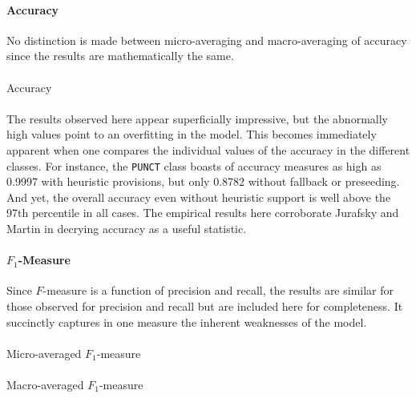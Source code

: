 \documentclass[11pt,a4paper]{article}
\begin{document}
\paragraph{Accuracy}
No distinction is made between micro-averaging and macro-averaging
of accuracy since the results are mathematically the same.

\paragraph{}
{\center\footnotesize Accuracy\\}
{\tiny\pgfplotstabletypeset[header=true]{\amicro}}

\paragraph{}
The results observed here appear superficially impressive,
but the abnormally high values point to an overfitting in the model.
This becomes immediately apparent when one compares the individual
values of the accuracy in the different classes. For instance,
the \texttt{PUNCT} class boasts of accuracy measures as high
as 0.9997 with heuristic provisions, but only 0.8782 without
fallback or preseeding. And yet, the overall accuracy even without
heuristic support is well above the 97th percentile in all cases.
The empirical results here corroborate Jurafsky and Martin 
in decrying accuracy as a useful statistic.

\paragraph{$F_{1}$-Measure}
Since $F$-measure is a function of precision and recall, the results are
similar for those observed for precision and recall but are included
here for completeness. It succinctly captures in one measure the
inherent weaknesses of the model.

\paragraph{}
{\center\footnotesize Micro-averaged $F_{1}$-measure\\}
{\tiny\pgfplotstabletypeset[header=true]{\fmicro}}

\paragraph{}
{\center\footnotesize Macro-averaged $F_{1}$-measure\\}
{\tiny\pgfplotstabletypeset[header=true]{\fmacro}}
\end{document}
